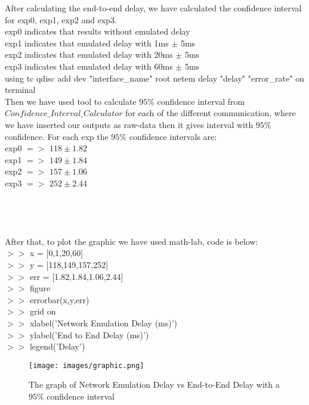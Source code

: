 After calculating the end-to-end delay, we have calculated the confidence interval for exp0, exp1, exp2 and exp3.\\
exp0 indicates that results without emulated delay\\
exp1 indicates that emulated delay with 1ms $\pm$ 5ms \\
exp2 indicates that emulated delay with 20ms $\pm$ 5ms\\
exp3 indicates that emulated delay with 60ms $\pm$ 5ms\\
using tc qdisc add dev "interface\_name" root netem delay "delay" "error\_rate" on terminal\\
Then we have used tool to calculate $95\%$ confidence interval from
\href{https://www.mathsisfun.com/data/confidence-interval-calculator.html}{$Confidence\_Interval\_Calculator$}
for each of the different communication, where we have inserted our outputs as raw-data then it gives interval with $95\%$ confidence. For each exp the $95\%$ confidence intervals are:\\
exp0 $=>$ $118 \pm 1.82$\\
exp1 $=>$ $149 \pm 1.84$\\
exp2 $=>$ $157 \pm 1.06$\\
exp3 $=>$ $252 \pm 2.44$\\
\\
\\
\\
\\
After that, to plot the graphic we have used math-lab, code is below:\\
$>>$ x = [0,1,20,60]\\
$>>$ y = [118,149,157,252]\\
$>>$ err = [1.82,1.84,1.06,2.44]\\
$>>$ figure\\
$>>$ errorbar(x,y,err)\\
$>>$ grid on\\
$>>$ xlabel('Network Emulation Delay (ms)')\\
$>>$ ylabel('End to End Delay (ms)')\\
$>>$ legend('Delay')\\

\begin{figure}[h]
   \centering
   \texttt{[image: images/graphic.png]}
    \caption{The graph of Network Emulation Delay vs End-to-End Delay with a $95\%$ confidence interval}
    \label{fig:graphic}
\end{figure}

